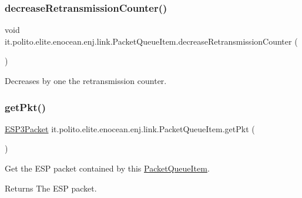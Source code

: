 \subsubsection{\texorpdfstring{decrease\+Retransmission\+Counter()}{decreaseRetransmissionCounter()}}
{\footnotesize\ttfamily void it.\+polito.\+elite.\+enocean.\+enj.\+link.\+Packet\+Queue\+Item.\+decrease\+Retransmission\+Counter (\begin{DoxyParamCaption}{ }\end{DoxyParamCaption})}

Decreases by one the retransmission counter. \hypertarget{classit_1_1polito_1_1elite_1_1enocean_1_1enj_1_1link_1_1_packet_queue_item_a2c92f41c178958824f112b5b8cff09bb}{}\label{classit_1_1polito_1_1elite_1_1enocean_1_1enj_1_1link_1_1_packet_queue_item_a2c92f41c178958824f112b5b8cff09bb} 
\subsubsection{\texorpdfstring{get\+Pkt()}{getPkt()}}
{\footnotesize\ttfamily \hyperlink{classit_1_1polito_1_1elite_1_1enocean_1_1protocol_1_1serial_1_1v3_1_1network_1_1packet_1_1_e_s_p3_packet}{E\+S\+P3\+Packet} it.\+polito.\+elite.\+enocean.\+enj.\+link.\+Packet\+Queue\+Item.\+get\+Pkt (\begin{DoxyParamCaption}{ }\end{DoxyParamCaption})}

Get the E\+SP packet contained by this \hyperlink{classit_1_1polito_1_1elite_1_1enocean_1_1enj_1_1link_1_1_packet_queue_item}{Packet\+Queue\+Item}.

\begin{DoxyReturn}{Returns}
The E\+SP packet. 
\end{DoxyReturn}
\hypertarget{classit_1_1polito_1_1elite_1_1enocean_1_1enj_1_1link_1_1_packet_queue_item_abdbd08f44a924454093e046ded073b99}{}\label{classit_1_1polito_1_1elite_1_1enocean_1_1enj_1_1link_1_1_packet_queue_item_abdbd08f44a924454093e046ded073b99} 
